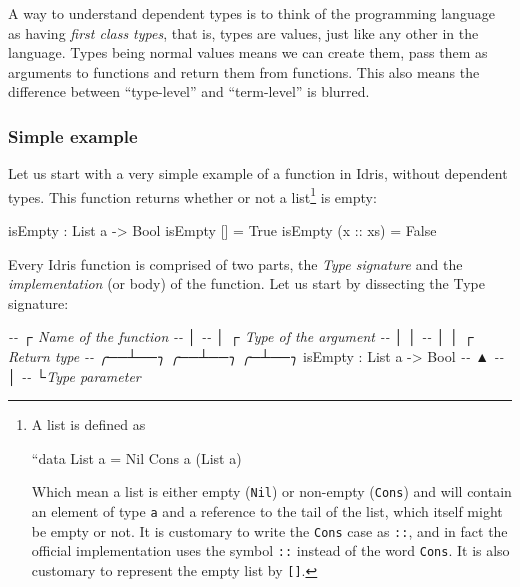 \documentclass[
]{article}
\newenvironment{Shaded}{}{}
\newcommand{\CommentTok}[1]{\textcolor[rgb]{0.38,0.63,0.69}{\textit{#1}}}
\newcommand{\DataTypeTok}[1]{\textcolor[rgb]{0.56,0.13,0.00}{#1}}
\newcommand{\NormalTok}[1]{#1}
\newcommand{\OperatorTok}[1]{\textcolor[rgb]{0.40,0.40,0.40}{#1}}
\newcommand{\OtherTok}[1]{\textcolor[rgb]{0.00,0.44,0.13}{#1}}
\begin{document}
A way to understand dependent types is to think of the programming
language as having \emph{first class types}, that is, types are values,
just like any other in the language. Types being normal values means we
can create them, pass them as arguments to functions and return them
from functions. This also means the difference between ``type-level''
and ``term-level'' is blurred.

\hypertarget{simple-example}{%
\subsubsection{Simple example}\label{simple-example}}

Let us start with a very simple example of a function in Idris, without
dependent types. This function returns whether or not a list\footnote{A
  list is defined as

  ``data List a = Nil \textbar{} Cons a (List a)

  Which mean a list is either empty (\texttt{Nil}) or non-empty
  (\texttt{Cons}) and will contain an element of type \texttt{a} and a
  reference to the tail of the list, which itself might be empty or not.
  It is customary to write the \texttt{Cons} case as \texttt{::}, and in
  fact the official implementation uses the symbol \texttt{::} instead
  of the word \texttt{Cons}. It is also customary to represent the empty
  list by \texttt{{[}{]}}.} is empty:

\begin{Shaded}
\begin{Highlighting}[]
\NormalTok{isEmpty }\OperatorTok{:} \DataTypeTok{List}\NormalTok{ a }\OtherTok{{-}\textgreater{}} \DataTypeTok{Bool}
\NormalTok{isEmpty [] }\OtherTok{=} \DataTypeTok{True}
\NormalTok{isEmpty (}\OtherTok{x ::}\NormalTok{ xs) }\OtherTok{=} \DataTypeTok{False}
\end{Highlighting}
\end{Shaded}

Every Idris function is comprised of two parts, the \emph{Type
signature} and the \emph{implementation} (or body) of the function. Let
us start by dissecting the Type signature:

\begin{Shaded}
\begin{Highlighting}[]
\CommentTok{{-}{-}    ┌ Name of the function}
\CommentTok{{-}{-}    │ }
\CommentTok{{-}{-}    │         ┌ Type of the argument }
\CommentTok{{-}{-}    │         │ }
\CommentTok{{-}{-}    │         │       ┌ Return type            }
\CommentTok{{-}{-} ╭──┴──╮   ╭──┴──╮  ╭─┴──╮}
\NormalTok{   isEmpty }\OperatorTok{:} \DataTypeTok{List}\NormalTok{ a }\OtherTok{{-}\textgreater{}} \DataTypeTok{Bool}
\CommentTok{{-}{-}                ▲}
\CommentTok{{-}{-}                │ }
\CommentTok{{-}{-}                └Type parameter}
\end{Highlighting}
\end{Shaded}
\end{document}
